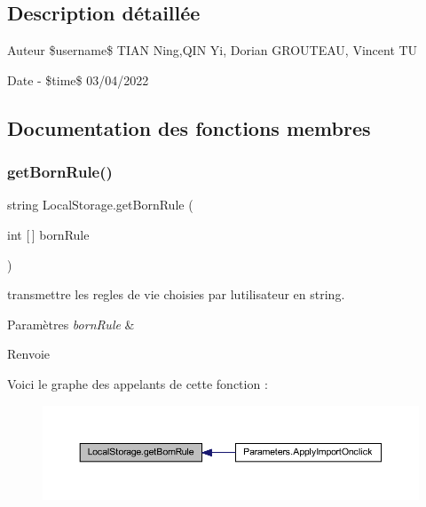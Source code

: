\subsection{Description détaillée}
\begin{DoxyAuthor}{Auteur}
\$username\$ T\+I\+AN Ning,Q\+IN Yi, Dorian G\+R\+O\+U\+T\+E\+AU, Vincent TU 
\end{DoxyAuthor}
\begin{DoxyDate}{Date}
-\/ \$time\$ 03/04/2022 
\end{DoxyDate}


\subsection{Documentation des fonctions membres}
\mbox{\label{class_local_storage_a64ead0288876a2aa3fbb7d86d3d68cc5}} 
\subsubsection{\texorpdfstring{get\+Born\+Rule()}{getBornRule()}}
{\footnotesize\ttfamily string Local\+Storage.\+get\+Born\+Rule (\begin{DoxyParamCaption}\item[{int \mbox{[}$\,$\mbox{]}}]{born\+Rule }\end{DoxyParamCaption})\hspace{0.3cm}{\ttfamily [inline]}}



transmettre les regles de vie choisies par l\textquotesingle{}utilisateur en string. 


\begin{DoxyParams}{Paramètres}
{\em born\+Rule} & \\
\hline
\end{DoxyParams}
\begin{DoxyReturn}{Renvoie}

\end{DoxyReturn}
Voici le graphe des appelants de cette fonction \+:\nopagebreak
\begin{figure}[H]
\begin{center}
\leavevmode
\includegraphics[width=350pt]{class_local_storage_a64ead0288876a2aa3fbb7d86d3d68cc5_icgraph}
\end{center}
\end{figure}
\mbox{\label{class_local_storage_ab5a516f6f13a01e683b6b1c56b373937}} 
